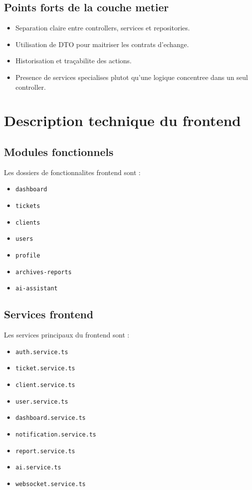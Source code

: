 \documentclass[12pt,a4paper]{article}
\begin{document}
\subsection{Points forts de la couche metier}

\begin{itemize}[leftmargin=1.2cm]
  \item Separation claire entre controllers, services et repositories.
  \item Utilisation de DTO pour maitriser les contrats d'echange.
  \item Historisation et traçabilite des actions.
  \item Presence de services specialises plutot qu'une logique concentree dans un seul controller.
\end{itemize}

\section{Description technique du frontend}

\subsection{Modules fonctionnels}

Les dossiers de fonctionnalites frontend sont :

\begin{itemize}[leftmargin=1.2cm]
  \item \texttt{dashboard}
  \item \texttt{tickets}
  \item \texttt{clients}
  \item \texttt{users}
  \item \texttt{profile}
  \item \texttt{archives-reports}
  \item \texttt{ai-assistant}
\end{itemize}

\subsection{Services frontend}

Les services principaux du frontend sont :

\begin{itemize}[leftmargin=1.2cm]
  \item \texttt{auth.service.ts}
  \item \texttt{ticket.service.ts}
  \item \texttt{client.service.ts}
  \item \texttt{user.service.ts}
  \item \texttt{dashboard.service.ts}
  \item \texttt{notification.service.ts}
  \item \texttt{report.service.ts}
  \item \texttt{ai.service.ts}
  \item \texttt{websocket.service.ts}
\end{itemize}
\end{document}
